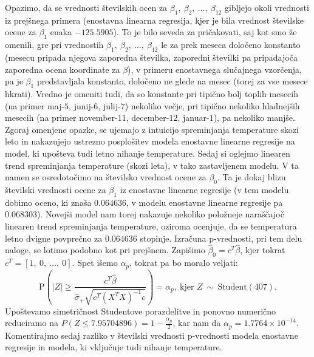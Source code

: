 \documentclass{article}
\begin{document}
Opazimo, da se vrednosti številskih ocen za $\beta_1,~\beta_2,~\dots,~\beta_{12}$ gibljejo okoli vrednosti iz prejšnega primera (enostavna linearna regresija, kjer je bila vrednost številske ocene za $\beta_1$ enaka $-125.5905$). 
To je bilo seveda za pričakovati, saj kot smo že omenili, gre pri vrednostih $\beta_1,~\beta_2,~\dots,~\beta_{12}$ le za prek meseca določeno konstanto (mesecu pripada njegova zaporedna številka, zaporedni številki pa pripadajoča zaporedna ocena koordinate za $\beta$), v primeru enostavnega slučajnega vzorčenja, pa je $\beta_1$ predstavljala konstanto, določeno ne glede na mesec (torej za vse mesece hkrati). 
Vredno je omeniti tudi, da so konstante pri tipično bolj toplih mesecih (na primer maj-$5$, junij-$6$, julij-$7$) nekoliko večje, pri tipično nekoliko hladnejših mesecih (na primer november-$11$, december-$12$, januar-$1$), pa nekoliko manjše.
Zgoraj omenjene opazke, se ujemajo z intuicijo spreminjanja temperature skozi leto in nakazujejo ustrezno posplošitev modela enostavne linearne regresije na model, ki upošteva tudi letno nihanje temperature. 
\newline
\newline
Sedaj si oglejmo linearen trend spreminjanja temperature (skozi leta), v tako zastavljenem modelu. V ta namen se osredotočimo na številsko vrednost ocene za $\beta_0$. Ta je dokaj blizu številski vrednosti ocene za $\beta_1$ iz enostavne linearne regresije (v tem modelu dobimo oceno, ki znaša $0.064636$, v modelu enostavne linearne regresije pa $0.068303$). 
Novejši model nam torej nakazuje nekoliko položneje naraščajoč linearen trend spreminjanja temperature, oziroma ocenjuje, da se temperatura letno dvigne povprečno za $0.064636$ stopinje.
\newline
\newline 
Izračuna p-vrednosti, pri tem delu naloge, se lotimo podobno kot pri prejšnem. Zapišimo $\hat{\beta}_0 = c^T\hat{\beta}$, kjer tokrat $c^T = [1,~0,~\dots,~0]$.
Spet išemo $\alpha_p$, tokrat pa bo moralo veljati:
$$
\text{P}\left(|Z| \geq \frac{c^T\hat{\beta}}{\hat{\sigma}_{+}\sqrt{c^T(X^TX)^{-1}c}}\right) = \alpha_p,~\text{kjer }Z~\sim~\text{Student}(407). 
$$
Upoštevamo simetričnost Studentove porazdelitve in ponovno numerično reduciramo na $P(Z \leq 7.95704896) = 1 - \frac{\alpha_p}{2}$, kar nam da $\alpha_p = 1.7764 \times 10^{-14}$.
\newline
\newline
Komentirajmo sedaj razliko v številski vrednosti p-vrednosti modela enostavne regresije in modela, ki vključuje tudi nihanje temperature. 
\end{document}
